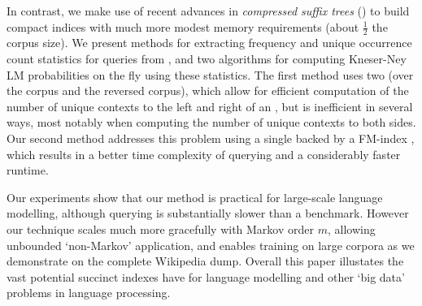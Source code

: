 %
%
%
%
 
In contrast, we make use of recent advances in  \emph{compressed suffix trees} (\CSTs) \cite{rno-talg11} 
to build compact indices with much more modest memory requirements (about
$\frac{1}{2}$ the corpus size).
We present methods for extracting frequency and unique occurrence count
statistics for \ngram queries from \CSTs,  and two algorithms for
computing Kneser-Ney LM probabilities on the fly using these statistics.
The first method uses two \CSTs (over the corpus and the reversed corpus),
which allow for efficient computation of the number of unique contexts to the left
and right of an \ngram, 
but is inefficient in several ways, most notably when computing the
number of unique contexts to both sides.
Our second method addresses this problem using a single \CST backed by
a FM-index \cite{fmmn-talg07}, which results in a better time
complexity of querying and a considerably faster runtime.
 
Our experiments show that our method is practical for large-scale language
modelling, although querying is substantially slower than a \SRILM benchmark.
However our technique scales much more gracefully with Markov order $m$, allowing
unbounded `non-Markov' application, and enables training on large
corpora as we demonstrate on the complete Wikipedia dump.
Overall this paper illustates the vast potential succinct indexes have for language modelling  and
other `big data' problems in language processing.

